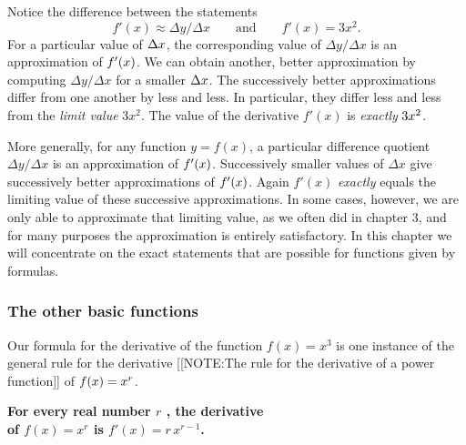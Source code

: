 	Notice the difference between the statements 
	\[
f'(x) \approx \Delta y/\Delta x \qquad \mbox{and} \qquad
		f'(x) = 3x^2.
\]
For a particular value of $\Delta x\/$, the corresponding value of $\Delta y/\Delta x$ is an approximation of $f'(x)\/$.  We can obtain another, better approximation by computing $\Delta y/\Delta x$ for a smaller $\Delta x\/$.  The successively better approximations differ from one another by less and less.  In particular, they differ less and less from the {\em limit value} $3x^2$.  The value of the derivative $f'(x)$ is {\em exactly} $3x^2\/$.

	More generally, for any function $y=f(x)$, a particular difference quotient $\Delta y/\Delta x$ is an approximation of $f'(x)\/$.  Successively smaller values of $\Delta x$ give successively better approximations of $f'(x)\/$.  Again $f'(x)$ {\em exactly} equals the limiting value of these successive approximations.   In some cases, however, we are only able to approximate that limiting value, as we often did in chapter 3, and for many purposes the approximation is entirely satisfactory.  In this chapter we will concentrate on the exact statements that are possible for functions given by formulas.

\subsubsection{The other basic functions} 
\label{subsubsec:the-other-basic-functions}

	Our formula for the derivative of the function  $f(x) = x^{3}$ is one instance of the general rule for the derivative 
	[[NOTE:The rule for  the derivative of  a power function]]
of $f(x) = x^r\/$.
\begin{observation}
\bf For every real number \boldmath $r$ \unboldmath, 			the derivative   \\
\bf of \hspace{.1in} \boldmath $f(x) = x^{\displaystyle r}$ \unboldmath \hspace{.1in} 	      is \hspace{.1in} \boldmath $f'(x) = r\, x^{\displaystyle r-1}$. \unboldmath
\end{observation}

